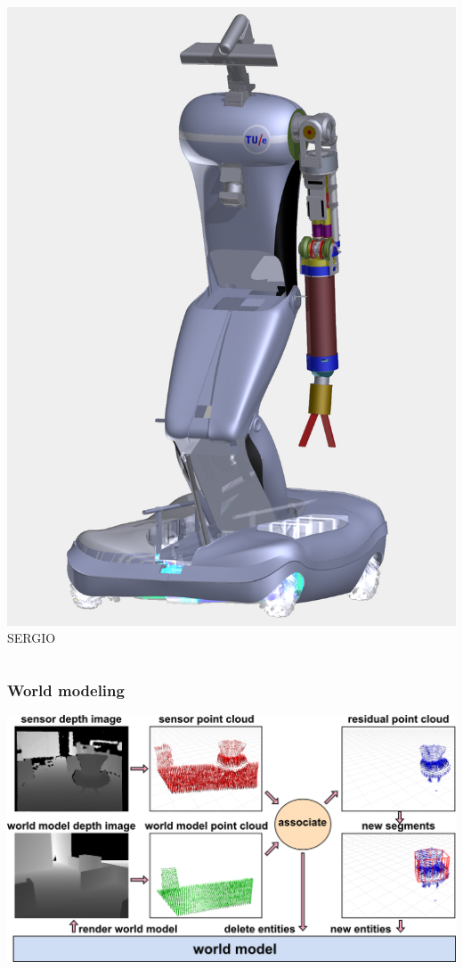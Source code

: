 \documentclass[t]{beamer}
\begin{document}
\begin{frame}
\begin{columns}
\begin{column}{0.3\textwidth}
\begin{center}
                \includegraphics[width = 1\linewidth]{Figures/SERGIO}\\
                SERGIO
            \end{center}
        \end{column}
    \end{columns}
\end{frame}

\begin{frame}
	\frametitle{World modeling}
	\bigskip
	\begin{center}
		\includegraphics[width=0.8\linewidth]{Figures/ed_pipeline}
	\end{center}
\end{frame}
\end{document}
